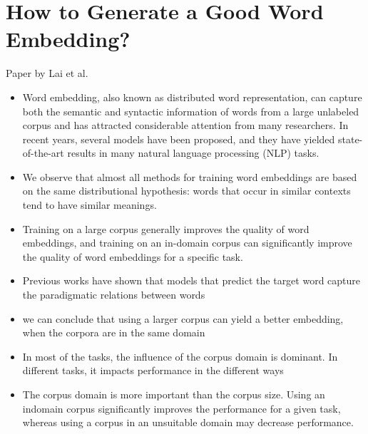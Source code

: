 \documentclass[10pt,a4paper]{article}
\begin{document}
\section{How to Generate a Good Word Embedding?}
Paper by Lai et al.\cite{lai2016generate}
\begin{itemize}
\item{Word embedding, also known as distributed word
representation, can capture both the semantic and syntactic
information of words from a large unlabeled corpus
and has attracted considerable attention from many researchers.
In recent years, several models have been proposed,
and they have yielded state-of-the-art results in many
natural language processing (NLP) tasks.}
\item{We observe that almost
all methods for training word embeddings are based on the
same distributional hypothesis: words that occur in similar
contexts tend to have similar meanings.}
\item{Training on a large corpus
generally improves the quality of word embeddings,
and training on an in-domain corpus can significantly
improve the quality of word embeddings for a specific
task.}
\item{Previous works have shown that models that predict the target word capture the paradigmatic relations between words}
\item{we can conclude that using a larger corpus can yield a better embedding, when the corpora are in the same domain}
\item{In most of the tasks, the influence of the corpus domain is
dominant. In different tasks, it impacts performance in the
different ways}
\item{The corpus
domain is more important than the corpus size. Using an indomain
corpus significantly improves the performance for a
given task, whereas using a corpus in an unsuitable domain
may decrease performance. }
\end{itemize}


\end{document}

